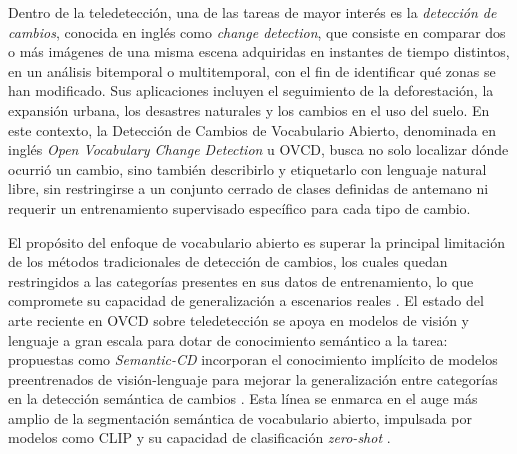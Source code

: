 Dentro de la teledetección, una de las tareas de mayor interés es la \textit{detección de cambios}, conocida en inglés como \textit{change detection}, que consiste en comparar dos o más imágenes de una misma escena adquiridas en instantes de tiempo distintos, en un análisis bitemporal o multitemporal, con el fin de identificar qué zonas se han modificado. Sus aplicaciones incluyen el seguimiento de la deforestación, la expansión urbana, los desastres naturales y los cambios en el uso del suelo. En este contexto, la Detección de Cambios de Vocabulario Abierto, denominada en inglés \textit{Open Vocabulary Change Detection} u OVCD, busca no solo localizar dónde ocurrió un cambio, sino también describirlo y etiquetarlo con lenguaje natural libre, sin restringirse a un conjunto cerrado de clases definidas de antemano ni requerir un entrenamiento supervisado específico para cada tipo de cambio.

El propósito del enfoque de vocabulario abierto es superar la principal limitación de los métodos tradicionales de detección de cambios, los cuales quedan restringidos a las categorías presentes en sus datos de entrenamiento, lo que compromete su capacidad de generalización a escenarios reales \parencite{zhu2025semanticcd}. El estado del arte reciente en OVCD sobre teledetección se apoya en modelos de visión y lenguaje a gran escala para dotar de conocimiento semántico a la tarea: propuestas como \textit{Semantic-CD} incorporan el conocimiento implícito de modelos preentrenados de visión-lenguaje para mejorar la generalización entre categorías en la detección semántica de cambios \parencite{zhu2025semanticcd}. Esta línea se enmarca en el auge más amplio de la segmentación semántica de vocabulario abierto, impulsada por modelos como CLIP y su capacidad de clasificación \textit{zero-shot} \parencite{radford2021clip}.

